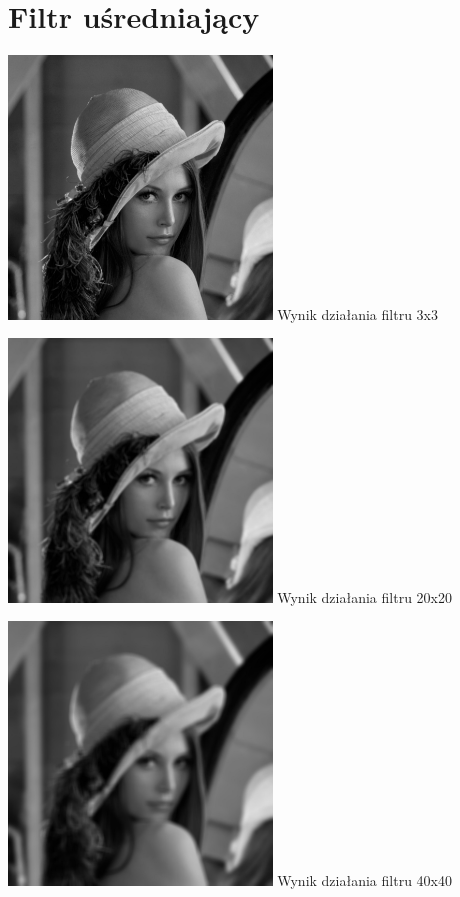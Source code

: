\documentclass[a4paper,12pt,openany]{report}
\begin{document}
\pagebreak
\section{Filtr uśredniający}

\begin{center}
\includegraphics[width=7cm]{resources/modified/lena/lena_blur_3x3.jpg}
\linebreak
\tiny{Wynik działania filtru 3x3}
\end{center}

\begin{center}
\includegraphics[width=7cm]{resources/modified/lena/lena_blur_20x20.jpg}
\linebreak
\tiny{Wynik działania filtru 20x20}
\end{center}

\begin{center}
\includegraphics[width=7cm]{resources/modified/lena/lena_blur_40x40.jpg}
\linebreak
\tiny{Wynik działania filtru 40x40}
\end{center}
\end{document}
